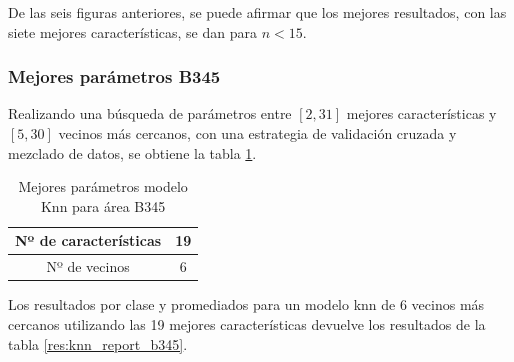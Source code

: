 De las seis figuras anteriores, se puede afirmar que los mejores resultados, con las siete mejores características, se dan para $n<15$.

\subsubsection{Mejores parámetros B345}

Realizando una búsqueda de parámetros entre $[2,31]$ mejores características y $[5,30]$ vecinos más cercanos, con una estrategia de validación cruzada y mezclado de datos, se obtiene la tabla \ref{res:knn_gs_b345}.

\begin{table}[H]
	\centering
	\captionsetup{justification=centering}
	\begin{tabular}{|c|c|}
		\hline
		Nº de características & 19 \\ \hline
		Nº de vecinos & 6 \\ \hline
	\end{tabular}
	\caption{Mejores parámetros modelo Knn para área B345}
	\label{res:knn_gs_b345}
\end{table}

Los resultados por clase y promediados para un modelo knn de 6 vecinos más cercanos utilizando las 19 mejores características devuelve los resultados de la tabla \ref{res:knn_report_b345}.

